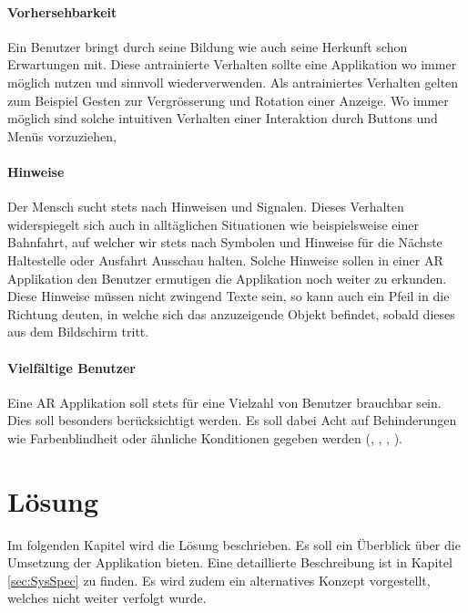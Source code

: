 \documentclass[a4paper]{scrreprt}
\begin{document}
\subsubsection{Vorhersehbarkeit}
Ein Benutzer bringt durch seine Bildung wie auch seine Herkunft schon Erwartungen mit. Diese antrainierte Verhalten sollte eine Applikation wo immer möglich nutzen und sinnvoll wiederverwenden. Als antrainiertes Verhalten gelten zum Beispiel Gesten zur Vergrösserung und Rotation einer Anzeige. Wo immer möglich sind solche intuitiven Verhalten einer Interaktion durch Buttons und Menüs vorzuziehen,

\subsubsection{Hinweise}
Der Mensch sucht stets nach Hinweisen und Signalen. Dieses Verhalten widerspiegelt sich auch in alltäglichen Situationen wie beispielsweise einer Bahnfahrt, auf welcher wir stets nach Symbolen und Hinweise für die Nächste Haltestelle oder Ausfahrt Ausschau halten.
Solche Hinweise sollen in einer AR Applikation den Benutzer ermutigen die Applikation noch weiter zu erkunden.
Diese Hinweise müssen nicht zwingend Texte sein, so kann auch ein Pfeil in die Richtung deuten, in welche sich das anzuzeigende Objekt befindet, sobald dieses aus dem Bildschirm tritt.

\subsubsection{Vielfältige Benutzer}
Eine AR Applikation soll stets für eine Vielzahl von Benutzer brauchbar sein. Dies soll besonders berücksichtigt werden. Es soll dabei Acht auf Behinderungen wie Farbenblindheit oder ähnliche Konditionen gegeben werden (\cite{AppleGuideline2018}, \cite{GoogleGuideline2018}, \cite{GoogleIO2018}, \cite{BerfinAyhan2017}).

\chapter{Lösung}
Im folgenden Kapitel wird die Lösung beschrieben. Es soll ein Überblick über die Umsetzung der Applikation bieten. Eine detaillierte Beschreibung ist in Kapitel \ref{sec:SysSpec} zu finden. Es wird zudem ein alternatives Konzept vorgestellt, welches nicht weiter verfolgt wurde.
\end{document}
